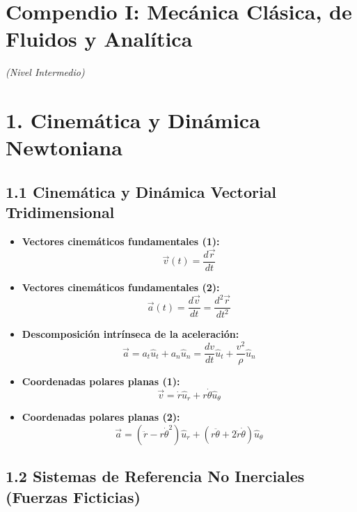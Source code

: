 \documentclass[11pt,a4paper]{article}
\begin{document}
\section*{Compendio I: Mecánica Clásica, de Fluidos y Analítica}

\textit{(Nivel Intermedio)}

\section*{1. Cinemática y Dinámica Newtoniana}

\subsection*{1.1 Cinemática y Dinámica Vectorial Tridimensional}

\begin{itemize}
  \item \textbf{Vectores cinemáticos fundamentales (1):}
  \[
    \vec{v}(t) = \frac{d\vec{r}}{dt}
  \]
  \item \textbf{Vectores cinemáticos fundamentales (2):}
  \[
    \vec{a}(t) = \frac{d\vec{v}}{dt} = \frac{d^2\vec{r}}{dt^2}
  \]
  \item \textbf{Descomposición intrínseca de la aceleración:}
  \[
    \vec{a} = a_t \hat{u}_t + a_n \hat{u}_n = \frac{dv}{dt} \hat{u}_t + \frac{v^2}{\rho} \hat{u}_n
  \]
  \item \textbf{Coordenadas polares planas (1):}
  \[
    \vec{v} = \dot{r} \hat{u}_r + r \dot{\theta} \hat{u}_\theta
  \]
  \item \textbf{Coordenadas polares planas (2):}
  \[
    \vec{a} = (\ddot{r} - r\dot{\theta}^2)\hat{u}_r + (r\ddot{\theta} + 2\dot{r}\dot{\theta})\hat{u}_\theta
  \]
\end{itemize}

\subsection*{1.2 Sistemas de Referencia No Inerciales (Fuerzas Ficticias)}
\end{document}
